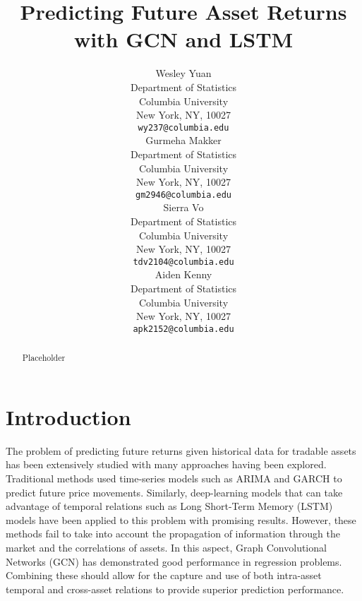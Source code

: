 \documentclass[12pt]{article}
\begin{document}
\title{Predicting Future Asset Returns with GCN and LSTM} %
\author{%
  Wesley Yuan \\
  Department of Statistics \\
  Columbia University \\
  New York, NY, 10027 \\
  \texttt{wy237@columbia.edu} \\
  \And
  Gurmeha Makker \\
  Department of Statistics \\
  Columbia University \\
  New York, NY, 10027 \\
  \texttt{gm2946@columbia.edu} \\
  \And
  Sierra Vo \\
  Department of Statistics \\
  Columbia University \\
  New York, NY, 10027 \\
  \texttt{tdv2104@columbia.edu} \\
  \And
  Aiden Kenny \\
  Department of Statistics \\
  Columbia University \\
  New York, NY, 10027 \\
  \texttt{apk2152@columbia.edu} \\
}

\maketitle

\begin{abstract}
Placeholder
\end{abstract}

\section{Introduction}

The problem of predicting future returns given historical data for tradable assets has been extensively studied with many approaches having been explored. Traditional methods used time-series models such as ARIMA and GARCH to predict future price movements. Similarly, deep-learning models that can take advantage of temporal relations such as Long Short-Term Memory (LSTM) models have been applied to this problem with promising results. However, these methods fail to take into account the propagation of information through the market and the correlations of assets. In this aspect, Graph Convolutional Networks (GCN) has demonstrated good performance in regression problems. Combining these should allow for the capture and use of both intra-asset temporal and cross-asset relations to provide superior prediction performance.
\end{document}
